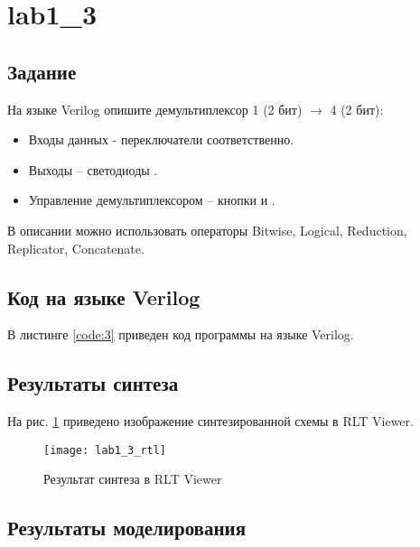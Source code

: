 \newpage

\section{lab1\_3}

\subsection{Задание}

На языке Verilog опишите демультиплексор 1 (2 бит) $\rightarrow$ 4 (2 бит):
\begin{itemize}
	\item Входы данных - переключатели  соответственно.
	\item Выходы – светодиоды .
	\item Управление демультиплексором – кнопки  и .
\end{itemize}

В описании можно использовать операторы Bitwise, Logical, Reduction, Replicator, Concatenate.

\subsection{Код на языке Verilog}

В листинге \ref{code:3} приведен код программы на языке Verilog.



\newpage

\subsection{Результаты синтеза}

На рис. \ref{fig:lab1_3_rtl} приведено изображение синтезированной схемы в RLT Viewer.

\begin{figure}[H]
\begin{center}
	\texttt{[image: lab1\_3\_rtl]}
	\caption{Результат синтеза в RLT Viewer}
	\label{fig:lab1_3_rtl}
\end{center}
\end{figure}

\subsection{Результаты моделирования}
\label{sec:lab1_3_modeling}

